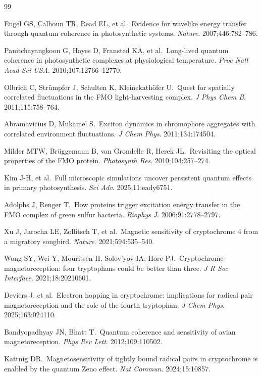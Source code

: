 \documentclass[11pt]{article}
\begin{document}
\begin{thebibliography}{99}
\small

Engel GS, Calhoun TR, Read EL, et al.\ Evidence for wavelike energy transfer through quantum 
coherence in photosynthetic systems. \textit{Nature}. 2007;446:782--786.

Panitchayangkoon G, Hayes D, Fransted KA, et al.\ Long-lived quantum coherence in photosynthetic 
complexes at physiological temperature. \textit{Proc Natl Acad Sci USA}. 2010;107:12766--12770.

Olbrich C, Str\"umpfer J, Schulten K, Kleinekath\"ofer U.\ Quest for spatially correlated 
fluctuations in the FMO light-harvesting complex. \textit{J Phys Chem B}. 2011;115:758--764.

Abramavicius D, Mukamel S.\ Exciton dynamics in chromophore aggregates with correlated 
environment fluctuations. \textit{J Chem Phys}. 2011;134:174504.

Milder MTW, Br\"uggemann B, van Grondelle R, Herek JL.\ Revisiting the optical properties of the 
FMO protein. \textit{Photosynth Res}. 2010;104:257--274.

Kim J-H, et al.\ Full microscopic simulations uncover persistent quantum effects in primary 
photosynthesis. \textit{Sci Adv}. 2025;11:eady6751.

Adolphs J, Renger T.\ How proteins trigger excitation energy transfer in the FMO complex of 
green sulfur bacteria. \textit{Biophys J}. 2006;91:2778--2797.

Xu J, Jarocha LE, Zollitsch T, et al.\ Magnetic sensitivity of cryptochrome 4 from a migratory 
songbird. \textit{Nature}. 2021;594:535--540.

Wong SY, Wei Y, Mouritsen H, Solov'yov IA, Hore PJ.\ Cryptochrome magnetoreception: four 
tryptophans could be better than three. \textit{J R Soc Interface}. 2021;18:20210601.

Deviers J, et al.\ Electron hopping in cryptochrome: implications for radical pair magnetoreception 
and the role of the fourth tryptophan. \textit{J Chem Phys}. 2025;163:024110.

Bandyopadhyay JN, Bhatt T.\ Quantum coherence and sensitivity of avian magnetoreception. 
\textit{Phys Rev Lett}. 2012;109:110502.

Kattnig DR.\ Magnetosensitivity of tightly bound radical pairs in cryptochrome is enabled by 
the quantum Zeno effect. \textit{Nat Commun}. 2024;15:10857.


\end{thebibliography}
\end{document}
